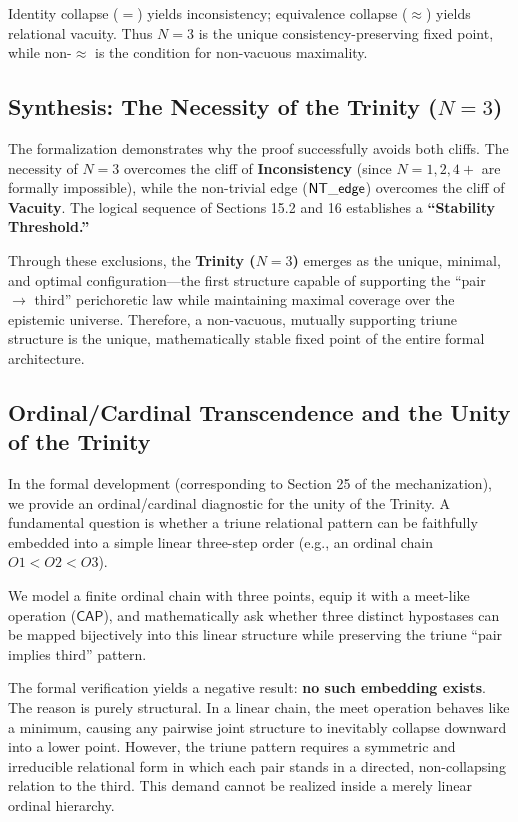 \documentclass[a4paper, 11pt]{article}
\theoremstyle{plain}
\theoremstyle{definition}
\begin{document}
Identity collapse ($=$) yields inconsistency; equivalence collapse ($\approx$) yields relational vacuity. Thus $N=3$ is the unique consistency-preserving fixed point, while non-$\approx$ is the condition for non-vacuous maximality.

\subsection{Synthesis: The Necessity of the Trinity ($N=3$)}
The formalization demonstrates why the proof successfully avoids both cliffs. The necessity of $N=3$ overcomes the cliff of \textbf{Inconsistency} (since $N=1, 2, 4+$ are formally impossible), while the non-trivial edge ($\mathsf{NT\_edge}$) overcomes the cliff of \textbf{Vacuity}. The logical sequence of Sections 15.2 and 16 establishes a \textbf{``Stability Threshold.''}

Through these exclusions, the \textbf{Trinity ($N=3$)} emerges as the unique, minimal, and optimal configuration—the first structure capable of supporting the ``pair $\to$ third'' perichoretic law while maintaining maximal coverage over the epistemic universe. Therefore, a non-vacuous, mutually supporting triune structure is the unique, mathematically stable fixed point of the entire formal architecture.

\subsection{Ordinal/Cardinal Transcendence and the Unity of the Trinity}
\label{sec:ordinal_transcendence}
In the formal development (corresponding to Section 25 of the mechanization), we provide an ordinal/cardinal diagnostic for the unity of the Trinity. A fundamental question is whether a triune relational pattern can be faithfully embedded into a simple linear three-step order (e.g., an ordinal chain $O1 < O2 < O3$).

We model a finite ordinal chain with three points, equip it with a meet-like operation ($\mathsf{CAP}$), and mathematically ask whether three distinct hypostases can be mapped bijectively into this linear structure while preserving the triune ``pair implies third'' pattern.

The formal verification yields a negative result: \textbf{no such embedding exists}. The reason is purely structural. In a linear chain, the meet operation behaves like a minimum, causing any pairwise joint structure to inevitably collapse downward into a lower point. However, the triune pattern requires a symmetric and irreducible relational form in which each pair stands in a directed, non-collapsing relation to the third. This demand cannot be realized inside a merely linear ordinal hierarchy.
\end{document}
